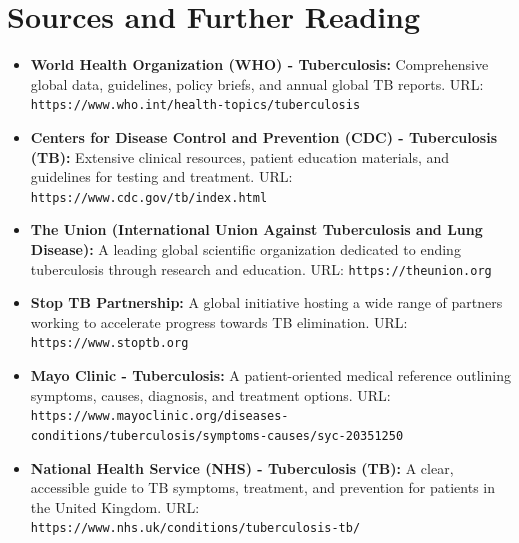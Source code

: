 \section*{Sources and Further Reading}
\begin{itemize}
    \item \textbf{World Health Organization (WHO) - Tuberculosis:} Comprehensive global data, guidelines, policy briefs, and annual global TB reports. URL: \texttt{https://www.who.int/health-topics/tuberculosis}
    \item \textbf{Centers for Disease Control and Prevention (CDC) - Tuberculosis (TB):} Extensive clinical resources, patient education materials, and guidelines for testing and treatment. URL: \texttt{https://www.cdc.gov/tb/index.html}
    \item \textbf{The Union (International Union Against Tuberculosis and Lung Disease):} A leading global scientific organization dedicated to ending tuberculosis through research and education. URL: \texttt{https://theunion.org}
    \item \textbf{Stop TB Partnership:} A global initiative hosting a wide range of partners working to accelerate progress towards TB elimination. URL: \texttt{https://www.stoptb.org}
    \item \textbf{Mayo Clinic - Tuberculosis:} A patient-oriented medical reference outlining symptoms, causes, diagnosis, and treatment options. URL: \texttt{https://www.mayoclinic.org/diseases-conditions/tuberculosis/symptoms-causes/syc-20351250}
    \item \textbf{National Health Service (NHS) - Tuberculosis (TB):} A clear, accessible guide to TB symptoms, treatment, and prevention for patients in the United Kingdom. URL: \texttt{https://www.nhs.uk/conditions/tuberculosis-tb/}
\end{itemize}